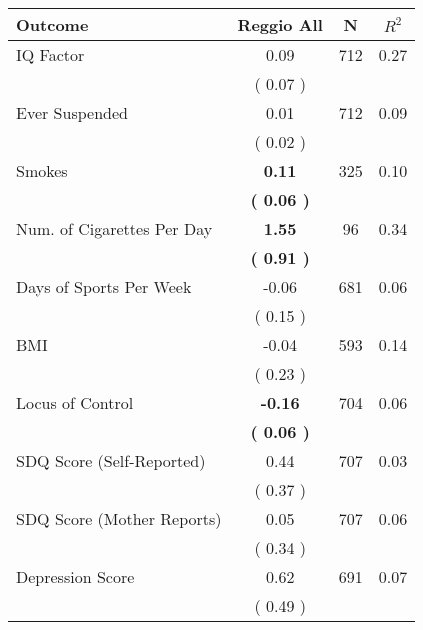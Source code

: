 \begin{tabular}{lccc}
\toprule
 \textbf{Outcome} & \textbf{Reggio All} & \textbf{N} & \textbf{$ R^2$} \\
\midrule
IQ Factor &      0.09 & 712 &      0.27 \\ 
 & (     0.07 ) & \\
Ever Suspended &      0.01 & 712 &      0.09 \\ 
 & (     0.02 ) & \\
Smokes & \textbf{     0.11} & 325 &      0.10 \\ 
 & \textbf{(     0.06 )} & \\
Num. of Cigarettes Per Day & \textbf{     1.55} & 96 &      0.34 \\ 
 & \textbf{(     0.91 )} & \\
Days of Sports Per Week &     -0.06 & 681 &      0.06 \\ 
 & (     0.15 ) & \\
BMI &     -0.04 & 593 &      0.14 \\ 
 & (     0.23 ) & \\
Locus of Control & \textbf{    -0.16} & 704 &      0.06 \\ 
 & \textbf{(     0.06 )} & \\
SDQ Score (Self-Reported) &      0.44 & 707 &      0.03 \\ 
 & (     0.37 ) & \\
SDQ Score (Mother Reports) &      0.05 & 707 &      0.06 \\ 
 & (     0.34 ) & \\
Depression Score &      0.62 & 691 &      0.07 \\ 
 & (     0.49 ) & \\
\bottomrule
\end{tabular}
